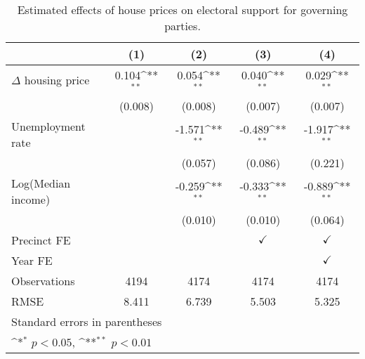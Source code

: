 \begin{table}[htbp]\centering
\def\sym#1{\ifmmode^{#1}\else\(^{#1}\)\fi}
\caption{Estimated effects of house prices on electoral support for governing parties.} \label{predv}
\begin{tabular}{l*{4}{c}}
\hline\hline
                    &\multicolumn{1}{c}{(1)}        &\multicolumn{1}{c}{(2)}        &\multicolumn{1}{c}{(3)}        &\multicolumn{1}{c}{(4)}        \\
\hline
$\Delta$ housing price&       0.104\sym{**}&       0.054\sym{**}&       0.040\sym{**}&       0.029\sym{**}\\
                    &     (0.008)        &     (0.008)        &     (0.007)        &     (0.007)        \\
[1em]
Unemployment rate   &                    &      -1.571\sym{**}&      -0.489\sym{**}&      -1.917\sym{**}\\
                    &                    &     (0.057)        &     (0.086)        &     (0.221)        \\
[1em]
Log(Median income)  &                    &      -0.259\sym{**}&      -0.333\sym{**}&      -0.889\sym{**}\\
                    &                    &     (0.010)        &     (0.010)        &     (0.064)        \\
[1em]
\hline Precinct FE  &                    &                    &$\checkmark$        &$\checkmark$        \\
[1em]
Year FE             &                    &                    &                    &$\checkmark$        \\
\hline
Observations        &        4194        &        4174        &        4174        &        4174        \\
RMSE                &       8.411        &       6.739        &       5.503        &       5.325        \\
\hline\hline
\multicolumn{5}{l}{\footnotesize Standard errors in parentheses}\\
\multicolumn{5}{l}{\footnotesize \sym{*} \(p<0.05\), \sym{**} \(p<0.01\)}\\
\end{tabular}
\end{table}
